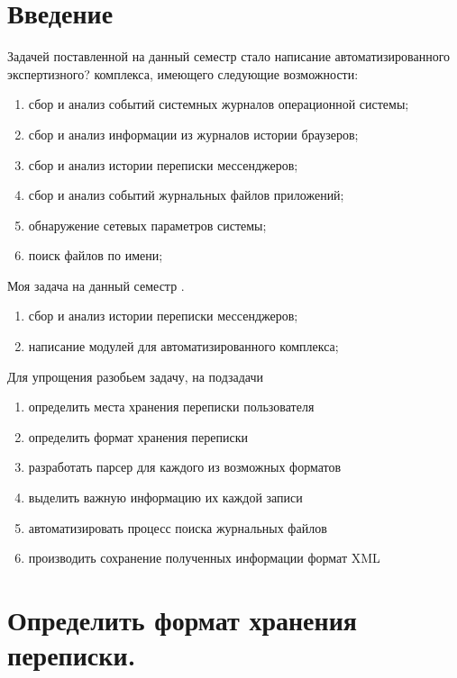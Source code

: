 \newpage

\chapter*{Введение}

Задачей поставленной на данный семестр стало написание автоматизированного экспертизного? комплекса, имеющего следующие возможности: \\

\begin{enumerate}
\item сбор и анализ событий системных журналов операционной системы;
\item сбор и анализ информации из журналов истории браузеров;
\item сбор и анализ истории переписки мессенджеров;
\item сбор и анализ событий журнальных файлов приложений;
\item обнаружение сетевых параметров системы;
\item поиск файлов по имени;
\end{enumerate}


Моя задача на данный семестр . \\

\begin{enumerate}
\item сбор и анализ истории переписки мессенджеров;
\item написание модулей для автоматизированного комплекса;
\end{enumerate}

Для упрощения разобьем задачу, на подзадачи
\begin{enumerate}
\item определить места хранения переписки пользователя
\item определить формат хранения переписки
\item разработать парсер для каждого из возможных форматов
\item выделить важную информацию их каждой записи
\item автоматизировать процесс поиска журнальных файлов
\item производить сохранение полученных информации формат XML
\end{enumerate}

\chapter*{Определить формат хранения переписки.}


